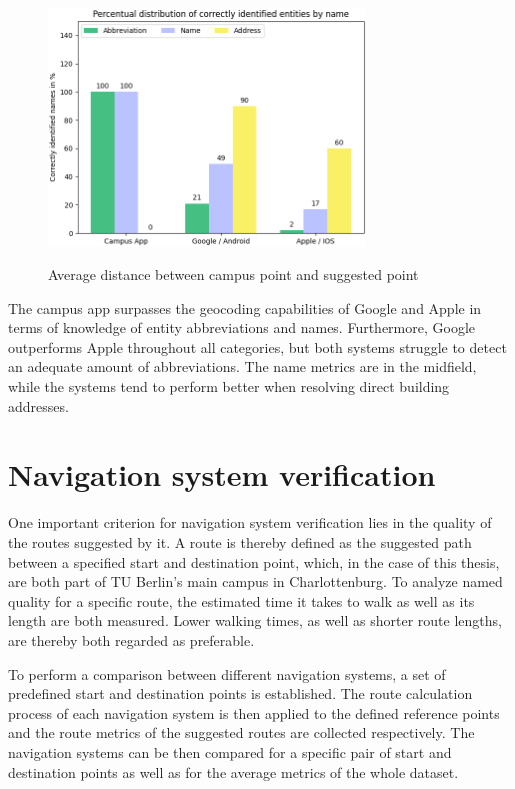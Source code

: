 \begin{figure}[H]
	\centering
	\includegraphics[width=0.75\textwidth]{images/results_geocoding_identifiers.png}\\
	\caption{Average distance between campus point and suggested point}
\end{figure}

The campus app surpasses the geocoding capabilities of Google and Apple in terms of knowledge of entity abbreviations and names. Furthermore, Google outperforms Apple throughout all categories, but both systems struggle to detect an adequate amount of abbreviations. The name metrics are in the midfield, while the systems tend to perform better when resolving direct building addresses.

\section{Navigation system verification} \label{sec:navigation_system_verification}
One important criterion for navigation system verification lies in the quality of the routes suggested by it. A route is thereby defined as the suggested path between a specified start and destination point, which, in the case of this thesis, are both part of TU Berlin's main campus in Charlottenburg. To analyze named quality for a specific route, the estimated time it takes to walk as well as its length are both measured. Lower walking times, as well as shorter route lengths, are thereby both regarded as preferable.

To perform a comparison between different navigation systems, a set of predefined start and destination points is established. The route calculation process of each navigation system is then applied to the defined reference points and the route metrics of the suggested routes are collected respectively. The navigation systems can be then compared for a specific pair of start and destination points as well as for the average metrics of the whole dataset. 

